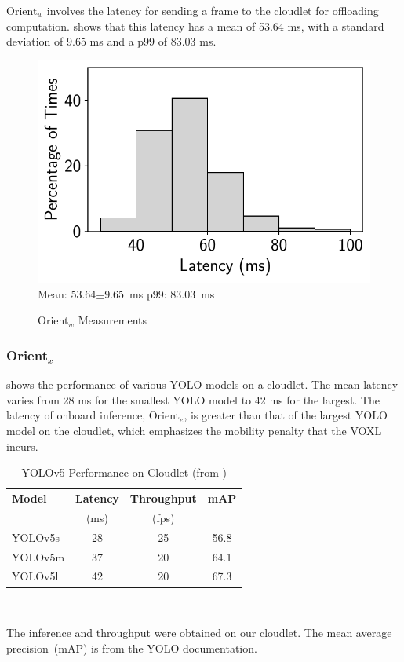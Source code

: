 Orient$_w$ involves the latency for sending a frame to the cloudlet for
offloading computation.  shows that this latency
has a mean of 53.64 ms, with a standard deviation of 9.65 ms and a p99 of
83.03 ms.

\begin{figure}[htbp]
    \centering
    \includegraphics[width = .4\textwidth]{figs/voxl-5g-latency.pdf}\\
\small{Mean: 53.64$\pm$9.65~ms\; p99: 83.03~ms}\\
\caption{Orient$_w$ Measurements}
\label{fig:voxl2-5g-latency}
\end{figure}

\subsubsection*{Orient$_{x}$}

 shows the performance of various YOLO models on a
cloudlet. The mean latency varies from 28 ms for the smallest YOLO model to 42
ms for the largest. The latency of onboard inference, Orient$_e$, is greater
than that of the largest YOLO model on the cloudlet, which emphasizes the
mobility penalty that the VOXL incurs.

\begin{table}[htbp]
\centering
\begin{tabular}{@{}lccc@{}}
\toprule
\textbf{Model} & \textbf{Latency} & \textbf{Throughput} & \textbf{mAP} \\
 & (ms) & (fps) & \\
\midrule
YOLOv5s  & 28 & 25 & 56.8\\
YOLOv5m  & 37 & 20 & 64.1\\
YOLOv5l  & 42 & 20 & 67.3\\
\bottomrule
\end{tabular}\\
\begin{captext}
  The inference and throughput were obtained on our
  cloudlet.  The mean average precision~(mAP)
  is from the YOLO documentation.
\end{captext}
\vspace{-0.1in}
\caption{YOLOv5 Performance on Cloudlet (from \cite{bala2025})}
\label{tab:yolo-model-stats}
\end{table}

